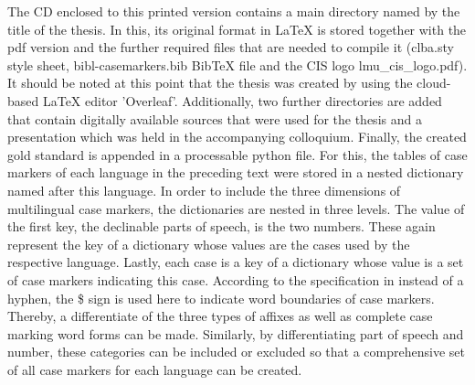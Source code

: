 \documentclass[11pt,a4paper,twoside,openright]{scrbook}
\begin{document}
\newpage






\newpage

\listoftables

\newpage




The CD enclosed to this printed version contains a main directory named by the title of the thesis. In this, its original format in LaTeX is stored together with the pdf version and the further required files that are needed to compile it (clba.sty style sheet, bibl-casemarkers.bib BibTeX file and the CIS logo lmu\_cis\_logo.pdf). It should be noted at this point that the thesis was created by using the cloud-based LaTeX editor 'Overleaf'. Additionally, two further directories are added that contain digitally available sources that were used for the thesis and a presentation which was held in the accompanying colloquium. Finally, the created gold standard is appended in a processable python file. For this, the tables of case markers of each language in the preceding text were stored in a nested dictionary named after this language. In order to include the three dimensions of multilingual case markers, the dictionaries are nested in three levels. The value of the first key, the declinable parts of speech, is the two numbers. These again represent the key of a dictionary whose values are the cases used by the respective language. Lastly, each case is a key of a dictionary whose value is a set of case markers indicating this case. According to the specification in \citet{weissweiler2022camel} instead of a hyphen, the \$ sign is used here to indicate word boundaries of case markers. Thereby, a differentiate of the three types of affixes as well as complete case marking word forms can be made. Similarly, by differentiating part of speech and number, these categories can be included or excluded so that a comprehensive set of all case markers for each language can be created.
\end{document}
